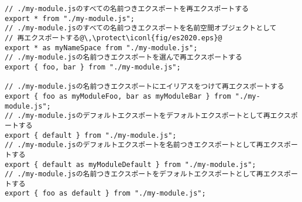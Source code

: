 \begin{lstlisting}[escapechar=\@]
// ./my-module.jsのすべての名前つきエクスポートを再エクスポートする
export * from "./my-module.js";
// ./my-module.jsのすべての名前つきエクスポートを名前空間オブジェクトとして
// 再エクスポートする@\,\protect\iconl{fig/es2020.eps}@
export * as myNameSpace from "./my-module.js";
// ./my-module.jsの名前つきエクスポートを選んで再エクスポートする
export { foo, bar } from "./my-module.js";

// ./my-module.jsの名前つきエクスポートにエイリアスをつけて再エクスポートする
export { foo as myModuleFoo, bar as myModuleBar } from "./my-module.js";
// ./my-module.jsのデフォルトエクスポートをデフォルトエクスポートとして再エクスポートする
export { default } from "./my-module.js";
// ./my-module.jsのデフォルトエクスポートを名前つきエクスポートとして再エクスポートする
export { default as myModuleDefault } from "./my-module.js";
// ./my-module.jsの名前つきエクスポートをデフォルトエクスポートとして再エクスポートする
export { foo as default } from "./my-module.js";
\end{lstlisting}
